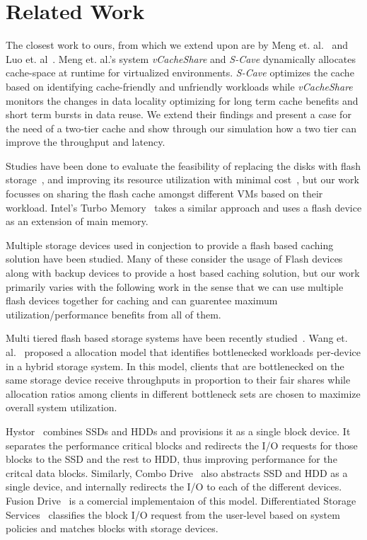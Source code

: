 \section{Related Work}

The closest work to ours, from which we extend upon are by Meng et. al.~\cite{meng_vcacheshare:_2014} and Luo et. al~\cite{luo_s-cave:_2013}. Meng et. al.'s system \emph{vCacheShare} and \emph{S-Cave} dynamically allocates cache-space at runtime for virtualized environments. \emph{S-Cave} optimizes the cache based on identifying cache-friendly and unfriendly workloads while \emph{vCacheShare} monitors the changes in data locality optimizing for long term cache benefits and short term bursts in data reuse. We extend their findings and present a case for the need of a two-tier cache and show through our simulation how a two tier can improve the throughput and latency.

Studies have been done to evaluate the feasibility of replacing the disks with flash storage~\cite{narayanan_migrating_2009}, and improving its resource utilization with minimal cost~\cite{tai_improving_2015}, but our work focusses on sharing the flash cache amongst different VMs based on their workload. Intel's Turbo Memory~\cite{matthews_intel&reg;_2008} takes a similar approach and uses a flash device as an extension of main memory.

Multiple storage devices used in conjection to provide a flash based caching solution have been studied. Many of these consider the usage of Flash devices along with backup devices to provide a host based caching solution, but our work primarily varies with the following work in the sense that we can use multiple flash devices together for caching and can guarentee maximum utilization/performance benefits from all of them. 

Multi tiered flash based storage systems have been recently studied~\cite{wang_balancing_2014, guerra_cost_2011, chen_hystor:_2011}. Wang et. al.~\cite{wang_balancing_2014} proposed a allocation model that identifies bottlenecked workloads per-device in a hybrid storage system. In this model, clients that are bottlenecked on the same storage device receive throughputs in proportion to their fair shares while allocation ratios among clients in different bottleneck sets are chosen to maximize overall system utilization.

Hystor~\cite{chen_hystor:_2011} combines SSDs and HDDs and provisions it as a single block device. It separates the performance critical blocks and redirects the I/O requests for those blocks to the SSD and the rest to HDD, thus improving performance for the critcal data blocks. Similarly, Combo Drive~\cite{sanvido_combo_2009} also abstracts SSD and HDD as a single device, and internally redirects the I/O to each of the different devices. Fusion Drive~\cite{apple_fusion_2012} is a comercial implementaion of this model. Differentiated Storage Services~\cite{mesnier_differentiated_2011} classifies the block I/O request from the user-level based on system policies and matches blocks with storage devices.

